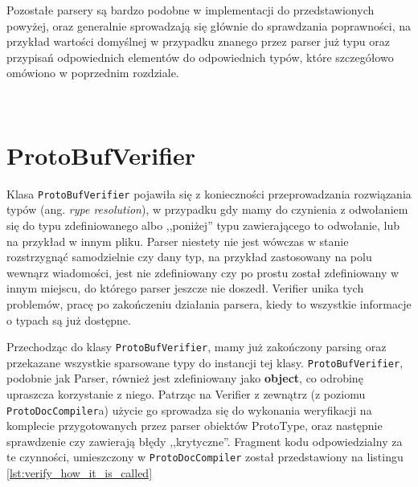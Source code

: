 \documentclass[pdflatex,11pt]{aghdpl}
\begin{document}
Pozostałe parsery są bardzo podobne w implementacji do przedstawionych powyżej, oraz generalnie sprowadzają się głównie do sprawdzania poprawności,
na przykład wartości domyślnej w przypadku znanego przez parser już typu oraz przypisań odpowiednich elementów do odpowiednich typów, które szczegółowo omówiono w poprzednim rozdziale.

~\\\*

% 
% 
% 


\section{ProtoBufVerifier}
\label{sec:verifier}
Klasa \verb|ProtoBufVerifier| pojawiła się z konieczności przeprowadzania rozwiązania typów (ang. \textit{rype resolution}),
w przypadku gdy mamy do czynienia z odwołaniem się do typu zdefiniowanego albo ,,poniżej'' typu zawierającego to odwołanie,
lub na przykład w innym pliku. Parser niestety nie jest wówczas w stanie rozstrzygnąć samodzielnie czy dany typ, na przykład zastosowany na polu wewnąrz wiadomości,
jest nie zdefiniowany czy po prostu został zdefiniowany w innym miejscu, do którego parser jeszcze nie doszedł. Verifier unika tych problemów, pracę po zakończeniu 
działania parsera, kiedy to wszystkie informacje o typach są już dostępne.

Przechodząc do klasy \verb|ProtoBufVerifier|, mamy już zakończony parsing oraz przekazane wszystkie sparsowane typy do instancji tej klasy.
\verb|ProtoBufVerifier|, podobnie jak Parser, również jest zdefiniowany jako \textbf{object}, co odrobinę upraszcza korzystanie z niego.
Patrząc na Verifier z zewnątrz (z poziomu \verb|ProtoDocCompiler|a) użycie go sprowadza się do wykonania weryfikacji na komplecie 
przygotowanych przez parser obiektów ProtoType, oraz następnie sprawdzenie czy zawierają błędy ,,krytyczne''. 
Fragment kodu odpowiedzialny za te czynności, umieszczony w \verb|ProtoDocCompiler| został przedstawiony na listingu \ref{lst:verify_how_it_is_called}
\end{document}
